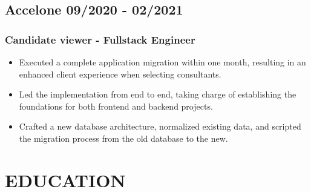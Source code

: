 \documentclass[12pt, letterpaper]{article}
\begin{document}
\subsection*{Accelone \hfill \small 09/2020 - 02/2021}

\subsubsection*{Candidate viewer - Fullstack Engineer}
\begin{itemize}
    \setlength\itemsep{0em}
    \item Executed a complete application migration within one month, resulting in an enhanced client experience when selecting consultants.
    \item Led the implementation from end to end, taking charge of establishing the foundations for both frontend and backend projects.
    \item Crafted a new database architecture, normalized existing data, and scripted the migration process from the old database to the new.
\end{itemize}

\section{EDUCATION}
\end{document}

